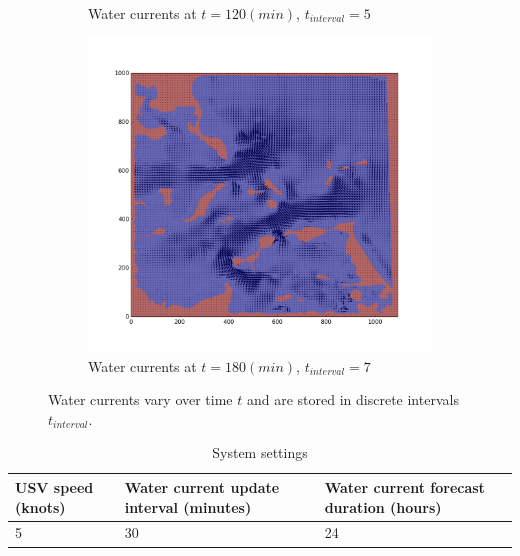 \documentclass{tamuccthesis}
\begin{document}
\begin{figure}
\begin{subfigure}[b]{0.475\textwidth}
        \caption[]{{\small Water currents at $t = 120 (min)$, $t_{interval} = 5$}}   
        \label{fig:currents_interval_5}
    \end{subfigure}
    \quad
    \begin{subfigure}[b]{0.475\textwidth}   
        \centering 
        \includegraphics[width=\textwidth,trim={3cm 3cm 3cm 3cm},clip]{Fig_currentsMap-7.png}
        \caption[interval 7]%
        {{\small Water currents at $t = 180 (min)$, $t_{interval} = 7$}}   
        \label{fig:currents_interval_7}
    \end{subfigure}
    \caption[]{\small Water currents vary over time $t$ and are stored in discrete intervals $t_{interval}$.} 
    \label{fig:currents_intervals}
\end{figure}

\begin{table}[H]\small
    \begin{tabular}{|l|l|l|}
    \hline
    USV speed (knots) & Water current update interval (minutes) & Water current forecast duration (hours) \\
    \hline
    5                 & 30                                      & 24 \\
    \hline
    \end{tabular}
    \caption{System settings}
    \label{sys_settings}
\end{table}
\end{document}
